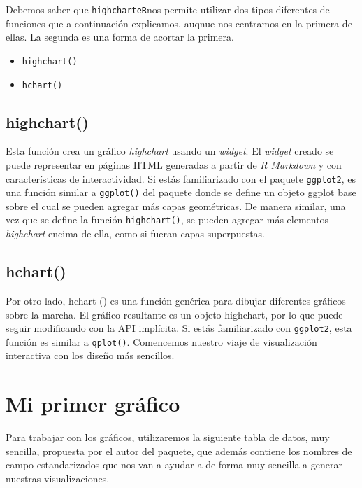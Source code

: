 \documentclass[
]{book}
\providecommand{\tightlist}{%
  \setlength{\itemsep}{0pt}\setlength{\parskip}{0pt}}
\begin{document}
Debemos saber que \texttt{highcharteR}nos permite utilizar dos tipos diferentes de funciones que a continuación explicamos, auqnue nos centramos en la primera de ellas. La segunda es una forma de acortar la primera.

\begin{itemize}
\tightlist
\item
  \texttt{highchart()}
\item
  \texttt{hchart()}
\end{itemize}

\hypertarget{highchart}{%
\subsection{highchart()}\label{highchart}}

Esta función crea un gráfico \emph{highchart} usando un \emph{widget}. El \emph{widget} creado se puede representar en páginas HTML generadas a partir de \emph{R Markdown} y con características de interactividad. Si estás familiarizado con el paquete \texttt{ggplot2}, es una función similar a \texttt{ggplot()} del paquete donde se define un objeto ggplot base sobre el cual se pueden agregar más capas geométricas. De manera similar, una vez que se define la función \texttt{highchart()}, se pueden agregar más elementos \emph{highchart} encima de ella, como si fueran capas superpuestas.

\hypertarget{hchart}{%
\subsection{hchart()}\label{hchart}}

Por otro lado, hchart () es una función genérica para dibujar diferentes gráficos sobre la marcha. El gráfico resultante es un objeto highchart, por lo que puede seguir modificando con la API implícita. Si estás familiarizado con \texttt{ggplot2}, esta función es similar a \texttt{qplot()}. Comencemos nuestro viaje de visualización interactiva con los diseño más sencillos.

\hypertarget{mi-primer-gruxe1fico}{%
\section{Mi primer gráfico}\label{mi-primer-gruxe1fico}}

Para trabajar con los gráficos, utilizaremos la siguiente tabla de datos, muy sencilla, propuesta por el autor del paquete, que además contiene los nombres de campo estandarizados que nos van a ayudar a de forma muy sencilla a generar nuestras visualizaciones.
\end{document}
